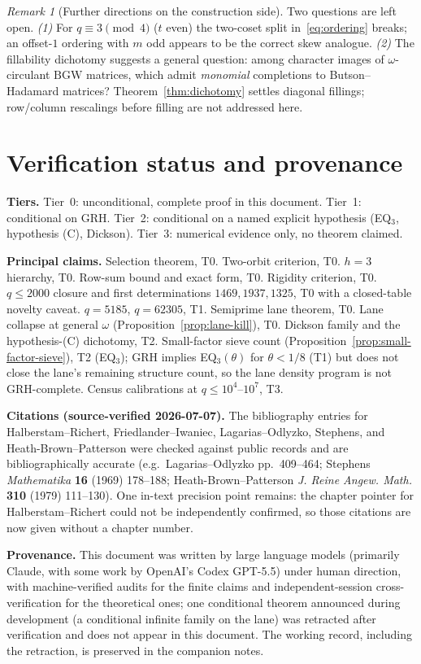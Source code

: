 \documentclass[11pt]{article}
\theoremstyle{plain}
\theoremstyle{definition}
\theoremstyle{remark}
\newtheorem{remark}[theorem]{Remark}
\begin{document}
\begin{remark}[Further directions on the construction side]\label{rem:maryfurther}
Two questions are left open. \emph{(1)} For $q\equiv3\pmod4$ ($t$ even) the
two-coset split in~\eqref{eq:ordering} breaks; an offset-$1$ ordering with $m$
odd appears to be the correct skew analogue. \emph{(2)} The fillability
dichotomy suggests a general question: among character images of
$\omega$-circulant $\mathrm{BGW}$ matrices, which admit \emph{monomial}
completions to Butson--Hadamard matrices? Theorem~\ref{thm:dichotomy} settles
diagonal fillings; row/column rescalings before filling are not addressed here.
\end{remark}


\section{Verification status and provenance}

\textbf{Tiers.} Tier~0: unconditional, complete proof in this document.
Tier~1: conditional on GRH. Tier~2: conditional on a named explicit
hypothesis (EQ$_3$, hypothesis (C), Dickson). Tier~3: numerical evidence
only, no theorem claimed.

\textbf{Principal claims.} Selection theorem, T0. Two-orbit criterion,
T0. $h=3$ hierarchy, T0. Row-sum bound and exact form, T0. Rigidity
criterion, T0. $q\le2000$ closure and first determinations $1469, 1937,
1325$, T0 with a closed-table novelty caveat. $q=5185$, $q=62305$, T1.
Semiprime lane theorem, T0. Lane collapse at general $\omega$
(Proposition~\ref{prop:lane-kill}), T0. Dickson family and the
hypothesis-(C) dichotomy, T2. Small-factor sieve count
(Proposition~\ref{prop:small-factor-sieve}), T2 (EQ$_3$); GRH implies
EQ$_3(\theta)$ for $\theta<1/8$ (T1) but does not close the lane's
remaining structure count, so the lane density program is not
GRH-complete. Census calibrations at $q\le10^4$--$10^7$, T3.

\textbf{Citations (source-verified 2026-07-07).} The bibliography entries
for Halberstam--Richert, Friedlander--Iwaniec, Lagarias--Odlyzko,
Stephens, and Heath-Brown--Patterson were checked against public records
and are bibliographically accurate (e.g.\ Lagarias--Odlyzko pp.~409--464;
Stephens \emph{Mathematika} \textbf{16} (1969) 178--188;
Heath-Brown--Patterson \emph{J. Reine Angew. Math.} \textbf{310} (1979)
111--130). One in-text precision point remains: the chapter pointer for
Halberstam--Richert could not be independently confirmed, so those
citations are now given without a chapter number.

\textbf{Provenance.} This document was written by large language models
(primarily Claude, with some work by OpenAI's Codex GPT-5.5) under human
direction, with machine-verified audits for the
finite claims and independent-session cross-verification for the
theoretical ones; one conditional theorem announced during development
(a conditional infinite family on the lane) was retracted after
verification and does not appear in this document. The working record,
including the retraction, is preserved in the companion notes.
\end{document}
